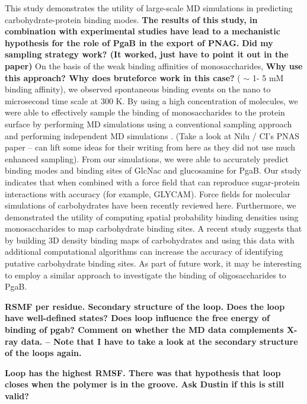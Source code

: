 This study demonstrates the utility of large-scale MD simulations in predicting carbohydrate-protein binding modes. \textbf{The results of this study, in combination with experimental studies have lead to a mechanistic hypothesis for the role of PgaB in the export of PNAG.} \textbf{Did my sampling strategy work? (It worked, just have to point it out in the paper)} On the basis of the weak binding affinities of monosaccharides, \textbf{Why use this approach?  Why does bruteforce work in this case?} ( $\sim$ 1- 5 mM binding affinity), we observed spontaneous binding events on the nano to microsecond time scale at 300 K.  By using a high concentration of molecules, we were able to effectively sample the binding of monosaccharides to the protein surface by performing MD simulations using a conventional sampling approach and performing independent MD simulations . (Take a look at Nilu / CI's PNAS paper -- can lift some ideas for their writing from here as they did not use much enhanced sampling).
From our simulations, we were able to accurately predict binding modes and binding sites of GlcNac and glucosamine for PgaB. Our study indicates that when combined with a force field that can reproduce sugar-protein interactions with accuracy (for example, GLYCAM\cite{Kirschner:2008ii}). Force fields for molecular simulations of carbohydrates have been recently reviewed here.\cite{Fadda:2010p5889} Furthermore, we demonstrated the utility of computing spatial probability binding densities using monosaccharides to map carbohydrate binding sites. A recent study suggests that by building 3D density binding maps of carbohydrates and using this data with additional computational algorithms can increase the accuracy of identifying putative carbohydrate binding sites.\cite{Tsai:2012bj} As part of future work, it may be interesting to employ a similar approach to investigate the binding of oligosaccharides to PgaB.

\textbf{RSMF per residue. Secondary structure of the loop. Does the loop have well-defined states? Does loop influence the free energy of binding of pgab? Comment on whether the MD data complements X-ray data. -- Note that I have to take a look at the secondary structure of the loops again.}

\textbf{Loop has the highest RMSF.  There was that hypothesis that loop closes when the polymer is in the groove.  Ask Dustin if this is still valid?}

